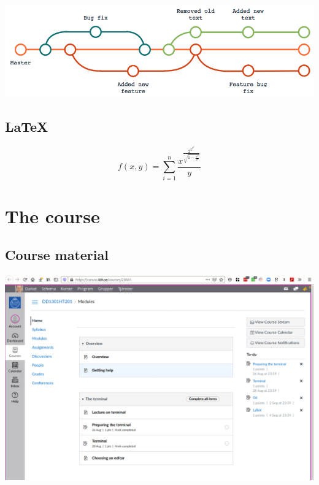 \begin{frame}
  \includegraphics[width=\columnwidth]{figs/version-tree.png}
\end{frame}


\subsection{\LaTeX}

\begin{frame}
\[
  f(x, y) = \sum_{i=1}^n 
  \frac{x^{\frac{2^{2^{2^{2^n}}}}{\sqrt{1-\frac{v^2}{c^2}}}}}{y}
\]

\end{frame}

\begin{frame}[fragile]
  
\end{frame}


\section{The course}

\subsection{Course material}

\begin{frame}
  \includegraphics[width=\columnwidth]{figs/canvas.png}
\end{frame}


